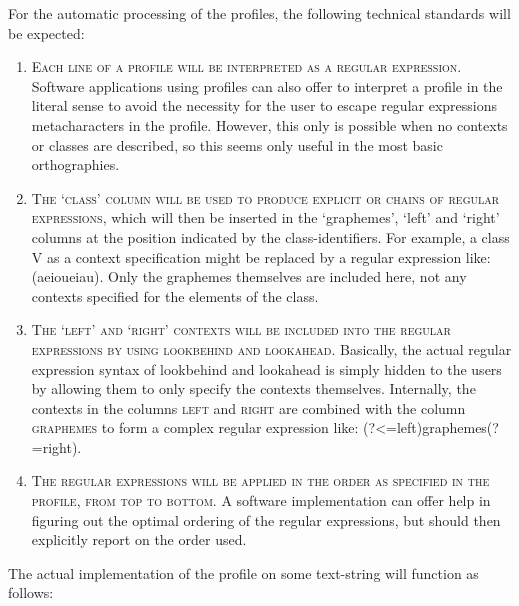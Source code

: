 For the automatic processing of the profiles, the following technical standards will be expected:

\begin{enumerate}
	\def\labelenumi{\arabic{enumi}.} 
	\item \textsc{Each line of a profile will be interpreted as a regular expression. }Software applications using profiles can also offer to interpret a profile in the literal sense to avoid the necessity for the user to escape regular expressions metacharacters in the profile. However, this only is possible when no contexts or classes are described, so this seems only useful in the most basic orthographies. 
	\item \textsc{The `class' column will be used to produce explicit \textsc{or} chains of regular expressions}, which will then be inserted in the `graphemes', `left' and `right' columns at the position indicated by the class-identifiers. For example, a class \textsc{V} as a context specification might be replaced by a regular expression like: (a\textbar{}e\textbar{}i\textbar{}o\textbar{}u\textbar{}ei\textbar{}au). Only the graphemes themselves are included here, not any contexts specified for the elements of the class. 
	\item \textsc{The `left' and `right' contexts will be included into the regular expressions by using lookbehind and lookahead}. Basically, the actual regular expression syntax of lookbehind and lookahead is simply hidden to the users by allowing them to only specify the contexts themselves. Internally, the contexts in the columns \textsc{left} and \textsc{right} are combined with the column \textsc{graphemes} to form a complex regular expression like: (?\textless{}=left)graphemes(?=right). 
	\item \textsc{The regular expressions will be applied in the order as specified in the profile, from top to bottom.} A software implementation can offer help in figuring out the optimal ordering of the regular expressions, but should then explicitly report on the order used. 
\end{enumerate}

The actual implementation of the profile on some text-string will function as follows:

